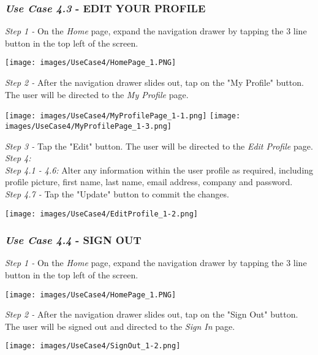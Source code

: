 \documentclass[11pt]{article}
\begin{document}
        \subsubsection{\textit{Use Case 4.3} - \uppercase{Edit Your Profile}}
            \textit{Step 1 -} On the \textit{Home} page, expand the navigation drawer by tapping the 3 line button in the top left of the screen.\\[0.5cm]
            \begin{center}
                \texttt{[image: images/UseCase4/HomePage\_1.PNG]}
            \end{center}
            \textit{Step 2 -} After the navigation drawer slides out, tap on the "My Profile" button. The user will be directed to the \textit{My Profile} page.\\[0.5cm]
            \begin{center}
                \texttt{[image: images/UseCase4/MyProfilePage\_1-1.png]}
                \newline
                \newline
                \texttt{[image: images/UseCase4/MyProfilePage\_1-3.png]}
            \end{center}
            \textit{Step 3 -} Tap the "Edit" button. The user will be directed to the \textit{Edit Profile} page.\\[0.5cm]
            \textit{Step 4:}\\[0.5cm]
            \textit{Step 4.1 - 4.6:} Alter any information within the user profile as required, including profile picture, first name, last name, email address, company and password.\\[0.5cm]
            \textit{Step 4.7 -} Tap the "Update" button to commit the changes.\\[0.5cm]
            \begin{center}
                \texttt{[image: images/UseCase4/EditProfile\_1-2.png]}
            \end{center}
        \subsubsection{\textit{Use Case 4.4} - \uppercase{Sign Out}}
            \textit{Step 1 -} On the \textit{Home} page, expand the navigation drawer by tapping the 3 line button in the top left of the screen.\\[0.5cm]
            \begin{center}
                \texttt{[image: images/UseCase4/HomePage\_1.PNG]}
            \end{center}
            \textit{Step 2 -} After the navigation drawer slides out, tap on the "Sign Out" button. The user will be signed out and directed to the \textit{Sign In} page.\\[0.5cm]
            \begin{center}
                \texttt{[image: images/UseCase4/SignOut\_1-2.png]}
            \end{center}
\end{document}
